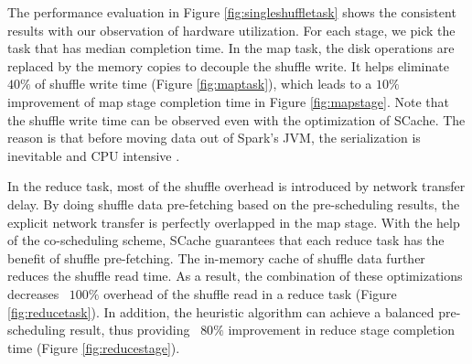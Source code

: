 The performance evaluation in Figure \ref{fig:singleshuffletask} shows the consistent results with our observation of hardware utilization. 
For each stage, we pick the task that has median completion time. 
In the map task, the disk operations are replaced by the memory copies to decouple the shuffle write. 
It helps eliminate $40\%$ of shuffle write time (Figure \ref{fig:maptask}), which leads to a $10\%$ improvement of map stage completion time in Figure \ref{fig:mapstage}. 
Note that the shuffle write time can be observed even with the optimization of SCache. 
The reason is that before moving data out of Spark's JVM, the serialization is inevitable and CPU intensive \cite{makingsense}. 

In the reduce task, most of the shuffle overhead is introduced by network transfer delay. 
By doing shuffle data pre-fetching based on the pre-scheduling results, the explicit network transfer is perfectly overlapped in the map stage. 
With the help of the co-scheduling scheme, SCache guarantees that each reduce task has the benefit of shuffle pre-fetching. 
The in-memory cache of shuffle data further reduces the shuffle read time. 
As a result, the combination of these optimizations decreases ~$100\%$ overhead of the shuffle read in a reduce task (Figure \ref{fig:reducetask}). 
In addition, the heuristic algorithm can achieve a balanced pre-scheduling result, thus providing ~$80\%$ improvement in reduce stage completion time (Figure \ref{fig:reducestage}).

